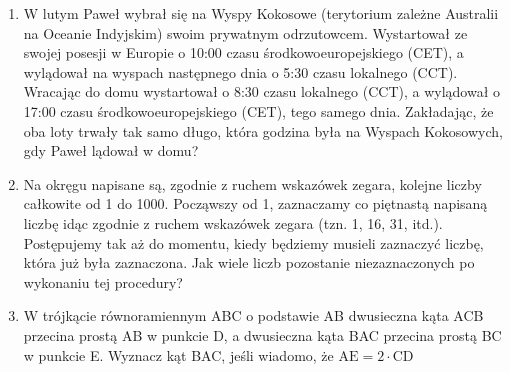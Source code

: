 \documentclass[10pt]{article}
\begin{document}
\begin{enumerate}
  \item W lutym Paweł wybrał się na Wyspy Kokosowe (terytorium zależne Australii na Oceanie Indyjskim) swoim prywatnym odrzutowcem. Wystartował ze swojej posesji w Europie o 10:00 czasu środkowoeuropejskiego (CET), a wylądował na wyspach następnego dnia o 5:30 czasu lokalnego (CCT). Wracając do domu wystartował o 8:30 czasu lokalnego (CCT), a wylądował o 17:00 czasu środkowoeuropejskiego (CET), tego samego dnia. Zakładając, że oba loty trwały tak samo długo, która godzina była na Wyspach Kokosowych, gdy Paweł lądował w domu?
  \item Na okręgu napisane są, zgodnie z ruchem wskazówek zegara, kolejne liczby całkowite od 1 do 1000. Począwszy od 1, zaznaczamy co piętnastą napisaną liczbę idąc zgodnie z ruchem wskazówek zegara (tzn. 1, 16, 31, itd.). Postępujemy tak aż do momentu, kiedy będziemy musieli zaznaczyć liczbę, która już była zaznaczona. Jak wiele liczb pozostanie niezaznaczonych po wykonaniu tej procedury?
  \item W trójkącie równoramiennym ABC o podstawie AB dwusieczna kąta ACB przecina prostą AB w punkcie D, a dwusieczna kąta BAC przecina prostą BC w punkcie E. Wyznacz kąt BAC, jeśli wiadomo, że \(\mathrm{AE}=2 \cdot \mathrm{CD}\)
\end{enumerate}
\end{document}
